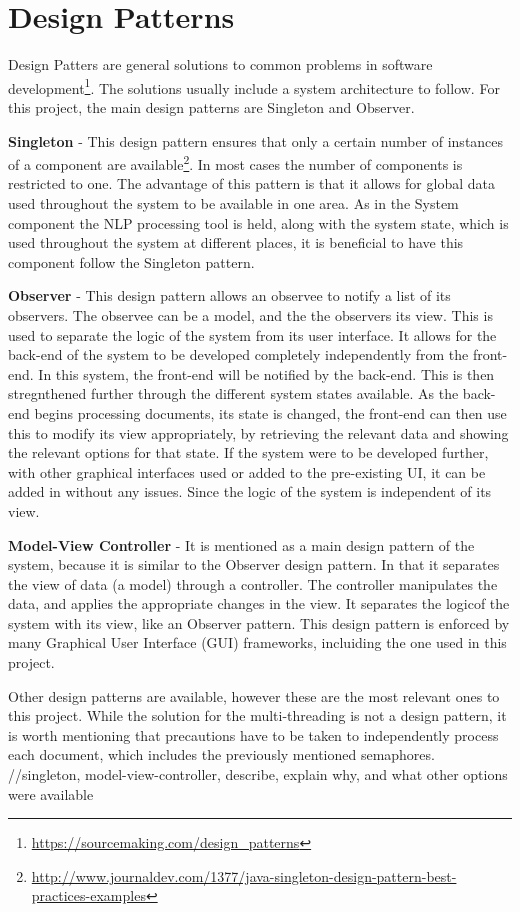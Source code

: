 \section{Design Patterns}
\par Design Patters are general solutions to common problems in software development\footnote{\url{https://sourcemaking.com/design_patterns}}. The solutions usually include a system architecture to follow. For this project, the main design patterns are Singleton and Observer.
\par \textbf{Singleton} - This design pattern ensures that only a certain number of instances of a component are available\footnote{\url{http://www.journaldev.com/1377/java-singleton-design-pattern-best-practices-examples}}. In most cases the number of components is restricted to one. The advantage of this pattern is that it allows for global data used throughout the system to be available in one area. As in the System component the NLP processing tool is held, along with the system state, which is used throughout the system at different places, it is beneficial to have this component follow the Singleton pattern. 
\par \textbf{Observer} - This design pattern allows an observee to notify a list of its observers. The observee can be a model, and the the observers its view. This is used to separate the logic of the system from its user interface. It allows for the back-end of the system to be developed completely independently from the front-end. In this system, the front-end will be notified by the back-end. This is then stregnthened further through the different system states available. As the back-end begins processing documents, its state is changed, the front-end can then use this to modify its view appropriately, by retrieving the relevant data and showing the relevant options for that state. If the system were to be developed further, with other graphical interfaces used or added to the pre-existing UI, it can be added in without any issues. Since the logic of the system is independent of its view.
\par \textbf{Model-View Controller} - It is mentioned as a main design pattern of the system, because it is similar to the Observer design pattern. In that it separates the view of data (a model) through a controller. The controller manipulates the data, and applies the appropriate changes in the view. It separates the logicof the system with its view, like an Observer pattern. This design pattern is enforced by many Graphical User Interface (GUI) frameworks, incluiding the one used in this project.
\par Other design patterns are available, however these are the most relevant ones to this project. While the solution for the multi-threading is not a design pattern, it is worth mentioning that precautions have to be taken to independently process each document, which includes the previously mentioned semaphores. 
//singleton, model-view-controller, describe, explain why, and what other options were available
